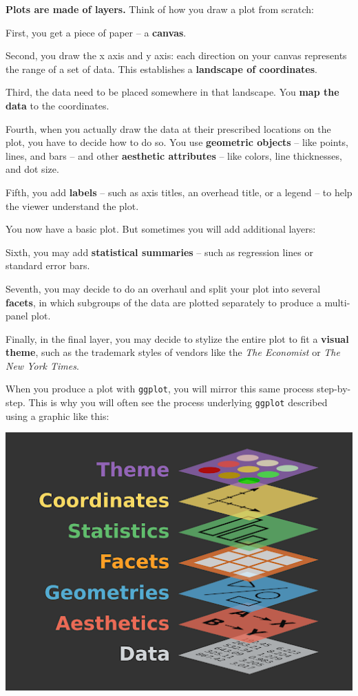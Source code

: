 \documentclass[
]{book}
\begin{document}
\textbf{Plots are made of layers.} Think of how you draw a plot from scratch:

First, you get a piece of paper -- a \textbf{canvas}.

Second, you draw the x axis and y axis: each direction on your canvas represents the range of a set of data. This establishes a \textbf{landscape of coordinates}.

Third, the data need to be placed somewhere in that landscape. You \textbf{map the data} to the coordinates.

Fourth, when you actually draw the data at their prescribed locations on the plot, you have to decide how to do so. You use \textbf{geometric objects} -- like points, lines, and bars -- and other \textbf{aesthetic attributes} -- like colors, line thicknesses, and dot size.

Fifth, you add \textbf{labels} -- such as axis titles, an overhead title, or a legend -- to help the viewer understand the plot.

You now have a basic plot. But sometimes you will add additional layers:

Sixth, you may add \textbf{statistical summaries} -- such as regression lines or standard error bars.

Seventh, you may decide to do an overhaul and split your plot into several \textbf{facets}, in which subgroups of the data are plotted separately to produce a multi-panel plot.

Finally, in the final layer, you may decide to stylize the entire plot to fit a \textbf{visual theme}, such as the trademark styles of vendors like the \emph{The Economist} or \emph{The New York Times}.

When you produce a plot with \texttt{ggplot}, you will mirror this same process step-by-step. This is why you will often see the process underlying \texttt{ggplot} described using a graphic like this:

\includegraphics{img/ggplot.png}
\end{document}
